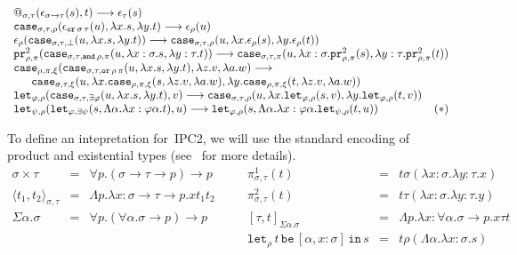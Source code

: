 \documentclass[a4paper,UKenglish,cleveref,autoref,numberwithinsect]{lipics-v2019}
\theoremstyle{definition}
\newcommand{\arrtype}{\rightarrow}
\newcommand{\abs}[2]{\lambda #1.#2}
\newcommand{\tabs}[2]{\Lambda #1.#2}
\newcommand{\pair}[2]{\langle #1,#2 \rangle}
\newcommand{\expair}[2]{[#1,#2]}
\newcommand{\red}{\longrightarrow}
\newcommand{\xlet}[4]{\mathtt{let}_{#1}\,#2\,\mathtt{be}\,[#3]\,\mathtt{in}\,#4}
\newcommand{\proj}{\mathtt{pr}}
\begin{document}
\[
\begin{array}{l}
@_{\sigma,\tau}(\epsilon_{\sigma \arrtype \tau}(s),t) \red
  \epsilon_\tau(s) \\
\mathtt{case}_{\sigma,\tau,\rho}(\epsilon_{\mathtt{or}\,\sigma\,\tau}(
  u),\abs{x}{s},\abs{y}{t}) \red \epsilon_\rho(u) \\
\epsilon_\rho(\mathtt{case}_{\sigma,\tau,\bot}(u,\abs{x}{s},
  \abs{y}{t})) \red
  \mathtt{case}_{\sigma,\tau,\rho}(u,\abs{x}{\epsilon_\rho(s)},
  \abs{y}{\epsilon_\rho(t)}) \\
  \proj^2_{\rho,\pi}(\mathtt{case}_{\sigma,\tau,\mathtt{and}\,\rho,\pi}(u,
  \abs{x:\sigma}{s},\abs{y:\tau}{t}))\red
  \mathtt{case}_{\sigma,\tau,\pi}(u,\abs{x:\sigma}{\proj^2_{\rho,\pi}(s)},
  \abs{y:\tau}{\proj^2_{\rho,\pi}(t)}) \\
\mathtt{case}_{\rho,\pi,\xi}(\mathtt{case}_{\sigma,\tau,\mathtt{or}\,
  \rho\,\pi}(u,\abs{x}{s},\abs{y}{t}),\abs{z}{v},
  \abs{a}{w}) \red \\
  \phantom{AB}
  \mathtt{case}_{\sigma,\tau,\xi}(u,\abs{x}{\mathtt{case}_{
  \rho,\pi,\xi}(s,\abs{z}{v},\abs{a}{w})},
  \abs{y}{\mathtt{case}_{\rho,\pi,\xi}(t,\abs{z}{v},
  \abs{a}{w})}) \\
\mathtt{let}_{\varphi,\rho}(
  \mathtt{case}_{\sigma,\tau,\exists\varphi}(
  u,\abs{x}{s},\abs{y}{t}),v) \red
  \mathtt{case}_{\sigma,\tau,\rho}(u,
  \abs{x}{\mathtt{let}_{\varphi,\rho}(s,v)},
  \abs{y}{\mathtt{let}_{\varphi,\rho}(t,v)}) \\
\mathtt{let}_{\psi,\rho}(\mathtt{let}_{\varphi,\exists\psi}(s,
  \tabs{\alpha}{\abs{x:\varphi\alpha}{t}}),u) \red
  \mathtt{let}_{\varphi,\rho}(s,\tabs{\alpha}{\abs{x:
  \varphi\alpha}{\mathtt{let}_{\psi,\rho}(t,u)}})
  \hfill (*) \\
\end{array}
\]

To define an intepretation for~IPC2, we will use the
standard encoding of
product and existential types (see~\cite[Chapter~11]{Girard1989} for
more details).
  \[
  \begin{array}{rclcrcl}
    \sigma \times \tau &=& \forall p . (\sigma \arrtype \tau \arrtype p) \arrtype p & \quad &
    \pi^1_{\sigma,\tau}(t) &=& t \sigma (\abs{x:\sigma}{\abs{y:\tau}{x}}) \\
    \pair{t_1}{t_2}_{\sigma,\tau} &=& \tabs{p}{\abs{x:\sigma\arrtype\tau\arrtype p}{x t_1 t_2}} & &
    \pi^2_{\sigma,\tau}(t) &=& t \tau (\abs{x:\sigma}{\abs{y:\tau}{y}}) \\
    \Sigma \alpha . \sigma &=& \forall p . (\forall \alpha . \sigma \arrtype p) \arrtype p & \quad &
    \expair{\tau}{t}_{\Sigma\alpha.\sigma} &=& \tabs{p}{\abs{x:\forall\alpha.\sigma\arrtype p}{x \tau t}} \\
    & & & &
    \xlet{\rho}{t}{\alpha,x:\sigma}{s} &=& t \rho (\tabs{\alpha}{\abs{x:\sigma}{s}}) \\
  \end{array}
  \]
\end{document}
